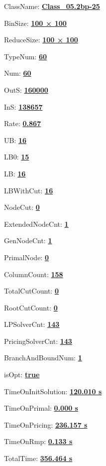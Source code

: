 \documentclass[11pt]{article}
\begin{document}
\pagestyle{empty}


ClassName: \underline{\textbf{Class_05.2bp-25}}
\par
BinSize: \underline{\textbf{100 × 100}}
\par
ReduceSize: \underline{\textbf{100 × 100}}
\par
TypeNum: \underline{\textbf{60}}
\par
Num: \underline{\textbf{60}}
\par
OutS: \underline{\textbf{160000}}
\par
InS: \underline{\textbf{138657}}
\par
Rate: \underline{\textbf{0.867}}
\par
UB: \underline{\textbf{16}}
\par
LB0: \underline{\textbf{15}}
\par
LB: \underline{\textbf{16}}
\par
LBWithCut: \underline{\textbf{16}}
\par
NodeCut: \underline{\textbf{0}}
\par
ExtendedNodeCnt: \underline{\textbf{1}}
\par
GenNodeCnt: \underline{\textbf{1}}
\par
PrimalNode: \underline{\textbf{0}}
\par
ColumnCount: \underline{\textbf{158}}
\par
TotalCutCount: \underline{\textbf{0}}
\par
RootCutCount: \underline{\textbf{0}}
\par
LPSolverCnt: \underline{\textbf{143}}
\par
PricingSolverCnt: \underline{\textbf{143}}
\par
BranchAndBoundNum: \underline{\textbf{1}}
\par
isOpt: \underline{\textbf{true}}
\par
TimeOnInitSolution: \underline{\textbf{120.010 s}}
\par
TimeOnPrimal: \underline{\textbf{0.000 s}}
\par
TimeOnPricing: \underline{\textbf{236.157 s}}
\par
TimeOnRmp: \underline{\textbf{0.133 s}}
\par
TotalTime: \underline{\textbf{356.464 s}}
\par
\newpage


\end{document}
